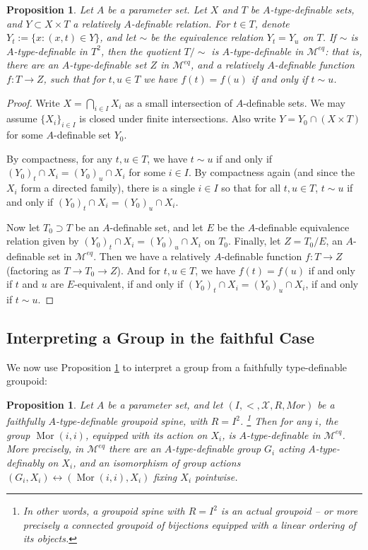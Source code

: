 \documentclass{amsart}
\newtheorem{proposition}[theorem]{Proposition}
\theoremstyle{definition}
\begin{document}
\begin{proposition}\label{P: elimination} Let $A$ be a parameter set. Let $X$ and $T$ be $A$-type-definable sets, and $Y\subset X\times T$ a relatively $A$-definable relation. For $t\in T$, denote $Y_t:=\{x:(x,t)\in Y\}$, and let $\sim$ be the equivalence relation $Y_t=Y_u$ on $T$. If $\sim$ is $A$-type-definable in $T^2$, then the quotient $T/\sim$ is $A$-type-definable in $\mathcal M^{eq}$: that is, there are an $A$-type-definable set $Z$ in $\mathcal M^{eq}$, and a relatively $A$-definable function $f:T\rightarrow Z$, such that for $t,u\in T$ we have $f(t)=f(u)$ if and only if $t\sim u$.
\end{proposition}

\begin{proof}
Write $X=\bigcap_{i\in I}X_i$ as a small intersection of $A$-definable sets. We may assume  $\{X_i\}_{i\in I}$ is closed under finite intersections. Also write $Y=Y_0\cap(X\times T)$ for some $A$-definable set $Y_0$.

By compactness, for any $t,u\in T$, we have $t\sim u$ if and only if $(Y_0)_t\cap X_i=(Y_0)_u\cap X_i$ for some $i\in I$. By compactness again (and since the $X_i$ form a directed family),  there is a single $i\in I$ so that for all $t,u\in T$, $t\sim u$ if and only if $(Y_0)_t\cap X_i=(Y_0)_u\cap X_i$.

Now let $T_0\supset T$ be an $A$-definable set, and let $E$ be the $A$-definable equivalence relation given by $(Y_0)_t\cap X_i=(Y_0)_u\cap X_i$ on $T_0$. Finally, let $Z=T_0/E$, an $A$-definable set in $\mathcal M^{eq}$. Then we have a relatively $A$-definable function $f:T\rightarrow Z$ (factoring as $T\rightarrow T_0\rightarrow Z$). And for $t,u\in T$, we have $f(t)=f(u)$ if and only if $t$ and $u$ are $E$-equivalent, if and only if $(Y_0)_t\cap X_i=(Y_0)_u\cap X_i$, if and only if $t\sim u$. 
\end{proof}

\subsection{Interpreting a Group in the faithful Case}

We now use Proposition \ref{P: elimination} to interpret a group from a faithfully type-definable groupoid:

\begin{proposition}\label{P: group from groupoind} Let $A$ be a parameter set, and let $(I,<,\mathcal X,R,Mor)$ be a faithfully $A$-type-definable groupoid spine, with $R=I^2$. \footnote{In other words, a groupoid spine with $R=I^2$ is an actual groupoid -- or more precisely a connected groupoid of bijections equipped with a linear ordering of its objects.} Then for any $i$, the group $\operatorname{Mor}(i,i)$, equipped with its action on $X_i$, is $A$-type-definable in $\mathcal M^{eq}$. More precisely, in $\mathcal M^{eq}$ there are an $A$-type-definable group $G_i$ acting $A$-type-definably on $X_i$, and an isomorphism of group actions $(G_i,X_i)\leftrightarrow(\operatorname{Mor}(i,i),X_i)$ fixing $X_i$ pointwise. 
\end{proposition}
\end{document}
